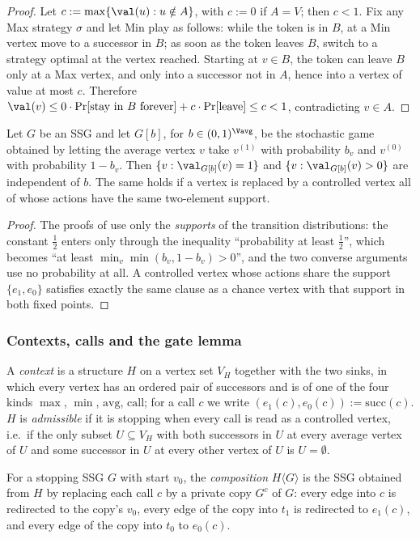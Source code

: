 \begin{proof}
Let $c:=\max\{\val(u):u\notin A\}$, with $c:=0$ if $A=V$; then $c<1$. Fix any
Max strategy $\sigma$ and let Min play as follows: while the token is in $B$,
at a Min vertex move to a successor in $B$; as soon as the token leaves $B$,
switch to a strategy optimal at the vertex reached. Starting at $v\in B$, the
token can leave $B$ only at a Max vertex, and only into a successor not in $A$,
hence into a vertex of value at most $c$. Therefore
$\val(v)\le 0\cdot\Pr[\text{stay in }B\text{ forever}]+c\cdot\Pr[\text{leave}]\le c<1$,
contradicting $v\in A$.
\end{proof}

\begin{corollary}\label{cor:fs16-bias}
Let $G$ be an SSG and let $G[b]$, for $b\in(0,1)^{\Vavg}$, be the stochastic
game obtained by letting the average vertex $v$ take $v^{(1)}$ with probability
$b_v$ and $v^{(0)}$ with probability $1-b_v$. Then
$\{v:\val_{G[b]}(v)=1\}$ and $\{v:\val_{G[b]}(v)>0\}$ are independent of $b$.
The same holds if a vertex is replaced by a controlled vertex all of whose
actions have the same two-element support.
\end{corollary}

\begin{proof}
The proofs of  use only the
\emph{supports} of the transition distributions: the constant $\tfrac12$ enters
only through the inequality ``probability at least $\tfrac12$'', which becomes
``at least $\min_v\min(b_v,1-b_v)>0$'', and the two converse arguments use no
probability at all. A controlled vertex whose actions share the support
$\{e_1,e_0\}$ satisfies exactly the same clause as a chance vertex with that
support in both fixed points.
\end{proof}

\subsubsection*{Contexts, calls and the gate lemma}

\begin{definition}\label{def:fs16-context}
A \emph{context} is a structure $H$ on a vertex set $V_H$ together with the two
sinks, in which every vertex has an ordered pair of successors and is of one of
the four kinds $\max$, $\min$, $\mathrm{avg}$, $\mathrm{call}$; for a call $c$
we write $(e_1(c),e_0(c)):=\mathrm{succ}(c)$. $H$ is \emph{admissible} if it is
stopping when every call is read as a controlled vertex, i.e.\ if the only
subset $U\subseteq V_H$ with both successors in $U$ at every average vertex of
$U$ and some successor in $U$ at every other vertex of $U$ is $U=\emptyset$.

For a stopping SSG $G$ with start $v_0$, the \emph{composition} $H\langle
G\rangle$ is the SSG obtained from $H$ by replacing each call $c$ by a private
copy $G^{c}$ of $G$: every edge into $c$ is redirected to the copy's $v_0$,
every edge of the copy into $t_1$ is redirected to $e_1(c)$, and every edge of
the copy into $t_0$ to $e_0(c)$.
\end{definition}

